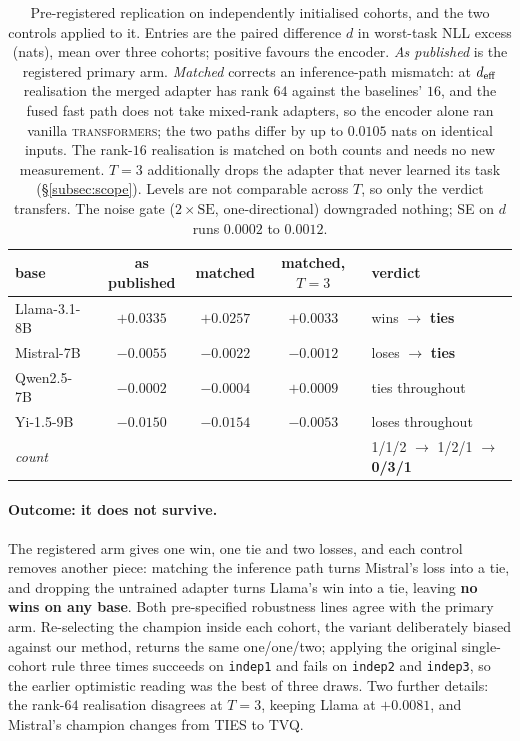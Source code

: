 \begin{table}[t]
\centering
\small
\caption{Pre-registered replication on independently initialised cohorts,
and the two controls applied to it. Entries are the paired difference $d$
in worst-task NLL excess (nats), mean over three cohorts; positive favours
the encoder. \emph{As published} is the registered primary arm.
\emph{Matched} corrects an inference-path mismatch: at $d_{\mathrm{eff}}$ realisation
the merged adapter has rank $64$ against the baselines' $16$, and the fused
fast path does not take mixed-rank adapters, so the encoder alone ran
vanilla \textsc{transformers}; the two paths differ by up to $0.0105$ nats
on identical inputs. The rank-$16$ realisation is matched on both counts
and needs no new measurement. $T = 3$ additionally drops the adapter that
never learned its task (\S\ref{subsec:scope}). Levels are not comparable
across $T$, so only the verdict transfers. The noise gate
($2\times\mathrm{SE}$, one-directional) downgraded nothing; SE on $d$ runs
$0.0002$ to $0.0012$.}
\label{tab:q1}
\begin{tabular}{lcccl}
\toprule
base & as published & matched & matched, $T=3$ & verdict \\
\midrule
Llama-3.1-8B & $+0.0335$ & $+0.0257$ & $+0.0033$ & wins $\to$ \textbf{ties} \\
Mistral-7B   & $-0.0055$ & $-0.0022$ & $-0.0012$ & loses $\to$ \textbf{ties} \\
Qwen2.5-7B   & $-0.0002$ & $-0.0004$ & $+0.0009$ & ties throughout \\
Yi-1.5-9B    & $-0.0150$ & $-0.0154$ & $-0.0053$ & loses throughout \\
\midrule
\multicolumn{4}{l}{\emph{count}} & 1/1/2 $\to$ 1/2/1 $\to$ \textbf{0/3/1} \\
\bottomrule
\end{tabular}
\end{table}

\paragraph{Outcome: it does not survive.} The registered arm gives one win,
one tie and two losses, and each control removes another piece: matching
the inference path turns Mistral's loss into a tie, and dropping the
untrained adapter turns Llama's win into a tie, leaving \textbf{no wins on
any base}. Both pre-specified robustness lines agree with the primary arm.
Re-selecting the champion inside each cohort, the variant deliberately
biased against our method, returns the same one/one/two; applying the
original single-cohort rule three times succeeds on \texttt{indep1} and
fails on \texttt{indep2} and \texttt{indep3}, so the earlier optimistic
reading was the best of three draws. Two further details: the rank-$64$ realisation disagrees at $T=3$, keeping Llama at
$+0.0081$, and Mistral's champion changes from TIES to TVQ.

